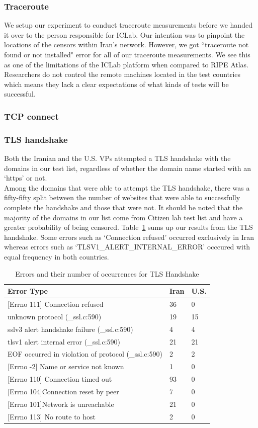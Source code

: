 \subsubsection{Traceroute} We setup our experiment to conduct traceroute measurements before we handed it over to the person responsible for ICLab. Our intention was to pinpoint the locations of the censors within Iran’s network. However, we got ``traceroute not found or not installed" error for all of our traceroute measurements. We see this as one of the limitations of the ICLab platform when compared to RIPE Atlas. Researchers do not control the remote machines located in the test countries which means they lack a clear expectations of what kinds of tests will be successful. \\
\subsubsection{TCP connect} 
\subsubsection{TLS handshake}
Both the Iranian and the U.S. VPs attempted a TLS handshake with the domains in our test list, regardless of whether the domain name started with an `https' or not. \\
Among the domains that were able to attempt the TLS handshake, there was a fifty-fifty split between the number of websites that were able to successfully complete the handshake and those that were not. It should be noted that the majority of the domains in our list come from Citizen lab test list and have a greater probability of being censored. Table~\ref{tab:error} sums up our results from the TLS handshake. Some errors such as `Connection refused' occurred exclusively in Iran whereas errors such as `TLSV1\_ALERT\_INTERNAL\_ERROR' occcured with equal frequency in both countries.\\
\begin{table}
  \caption{Errors and their number of occurrences for TLS Handshake}
  \label{tab:error}
  \begin{tabular}{ |p{5cm} |p{1cm} | p{1cm} |}
    \hline\hline
    Error Type&Iran&U.S.\\
    \hline
    {[Errno 111]} Connection refused&36&0\\
	unknown protocol (\_ssl.c:590)&19&15\\
	sslv3 alert handshake failure (\_ssl.c:590)&4&4\\
	 tlsv1 alert internal error (\_ssl.c:590)&21&21\\
	EOF occurred in violation of protocol (\_ssl.c:590)&2&2\\
	{[Errno -2]} Name or service not known&1&0\\
	{[Errno 110]} Connection timed out&93&0\\
	{[Errno 104]}Connection reset by peer&7&0\\
	{[Errno 101]}Network is unreachable&21&0\\
	{[Errno 113]} No route to host&2&0\\
 \hline
\end{tabular}
\end{table}

